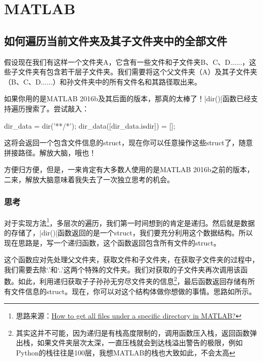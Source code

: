 \chapter{MATLAB}

\section{如何遍历当前文件夹及其子文件夹中的全部文件}

假设现在我们有这样一个文件夹A，它含有一些文件和子文件夹B、C、D......，这些子文件夹有包含若干层子文件夹。我们需要将这个父文件夹（A）及其子文件夹（B、C、D......）和孙文件夹中的所有文件名和其路径取出来。

如果你用的是MATLAB 2016b及其后面的版本，那真的太棒了！\Matlabinline|dir()|函数已经支持遍历搜索了。尝试敲入：

\begin{Matlabcode}
dir_data = dir('**/*');
dir_data([dir_data.isdir]) = [];  %
\end{Matlabcode}

这将会返回一个包含文件信息的struct，现在你可以任意操作这些struct了，随意拼接路径。解放大脑，哦也！

方便归方便，但是，一来肯定有大多数人使用的是MATLAB 2016b之前的版本，二来，解放大脑意味着我失去了一次独立思考的机会。

\subsection*{思考}

对于实现方法\footnote{思路来源：\href{https://stackoverflow.com/questions/2652630/how-to-get-all-files-under-a-specific-directory-in-matlab}{How to get all files under a specific directory in MATLAB?}}，多层次的遍历，我们第一时间想到的肯定是递归。然后就是数据的存储了，\Matlabinline|dir()|函数返回的是一个struct，我们要充分利用这个数据结构。所以现在思路是，写一个递归函数，这个函数返回包含所有文件的struct。

这个函数应对先处理父文件夹，获取文件和子文件夹，在获取子文件夹的过程中，我们需要去除`.'和`..'这两个特殊的文件夹。我们对获取的子文件夹再次调用该函数。如此，利用递归获取子子孙孙无穷尽文件夹的信息\footnote{其实这并不可能，因为递归是有栈高度限制的，调用函数压入栈，返回函数弹出栈，如果文件夹层次太深，一直压栈就会到达栈溢出警告的极限，例如Python的栈往往是100层，我想MATLAB的栈也大致如此，不会太高}，最后函数返回存储有所有文件信息的struct。现在，你可以对这个结构体做你想做的事情。思路如所示。

